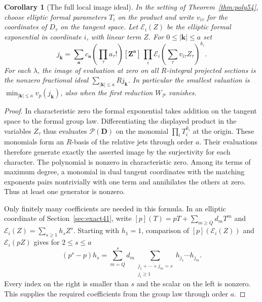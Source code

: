 \documentclass[a4paper,11pt]{article}
\newtheorem{corollary}[proposition]{Corollary}
\theoremstyle{definition}
\theoremstyle{remark}
\numberwithin{equation}{section}
\begin{document}
\begin{corollary}[The full local image ideal]\label{cor:all54}
In the setting of Theorem~\ref{thm:poly54}, choose elliptic formal
parameters \(T_i\) on the product and write \(v_{i\tau}\) for the
coordinates of \(D_\tau\) on the tangent space. Let
\(\mathcal E_i(Z)\) be the elliptic formal exponential in coordinate
\(i\), with linear term \(Z\). For \(0\le|\boldsymbol k|\le a\) set
\[
 j_{\boldsymbol k}
 =\sum_{\boldsymbol a} c_{\boldsymbol a}
       \left(\prod_\tau a_\tau!\right)
       [\boldsymbol Z^{\boldsymbol a}]\,
        \prod_i\mathcal E_i\!\left(\sum_\tau v_{i\tau}Z_\tau\right)^{k_i}.
\]
For each \(\lambda\), the image of evaluation at zero on all
\(R\)-integral projected sections is the nonzero fractional ideal
\(\sum_{|\boldsymbol k|\le a}Rj_{\boldsymbol k}\). In particular
the smallest valuation is \(\min_{|\boldsymbol k|\le a}v_p(j_{\boldsymbol k})\),
also when the first reduction \(W_{\mathcal P}\) vanishes.
\end{corollary}
\begin{proof}
In characteristic zero the formal exponential takes addition on
the tangent space to the formal group law. Differentiating the
displayed product in the variables \(Z_\tau\) thus evaluates
\(\mathcal P(\boldsymbol D)\) on the monomial
\(\prod_iT_i^{k_i}\) at the origin. These monomials form an \(R\)-basis
of the relative jets through order \(a\). Their evaluations therefore
generate exactly the asserted image by the surjectivity for each
character. The polynomial is nonzero in characteristic zero. Among
its terms of maximum degree, a monomial in dual tangent coordinates
with the matching exponents pairs nontrivially with one term and
annihilates the others at zero. Thus at least one generator is nonzero.

Only finitely many coefficients are needed in this formula. In an
elliptic coordinate of Section~\ref{sec:exact41}, write
\([p](T)=pT+\sum_{m\ge Q}d_mT^m\) and
\(\mathcal E_i(Z)=\sum_{s\ge1}h_sZ^s\). Starting with \(h_1=1\),
comparison of \([p](\mathcal E_i(Z))\) and
\(\mathcal E_i(pZ)\) gives for \(2\le s\le a\)
\[
        (p^s-p)h_s=\sum_{m=Q}^s d_m
           \sum_{\substack{j_1+\cdots+j_m=s\\j_i\ge1}}
                         h_{j_1}\cdots h_{j_m}.
\]
Every index on the right is smaller than \(s\) and the scalar on
the left is nonzero. This supplies the required coefficients from
the group law through order \(a\).
\end{proof}
\end{document}
